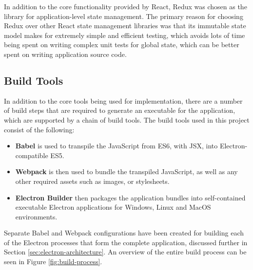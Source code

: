 In addition to the core functionality provided by React, Redux was chosen as the library for application-level state management. The primary reason for choosing Redux over other React state management libraries was that its immutable state model makes for extremely simple and efficient testing, which avoids lots of time being spent on writing complex unit tests for global state, which can be better spent on writing application source code.

\subsection{Build Tools}
In addition to the core tools being used for implementation, there are a number of build steps that are required to generate an executable for the application, which are supported by a chain of build tools. The build tools used in this project consist of the following:

\begin{itemize}
  \item \textbf{Babel} is used to transpile the JavaScript from ES6, with JSX, into Electron-compatible ES5.
  \item \textbf{Webpack} is then used to bundle the transpiled JavaScript, as well as any other required assets such as images, or stylesheets.
  \item \textbf{Electron Builder} then packages the application bundles into self-contained executable Electron applications for Windows, Linux and MacOS environments.
\end{itemize}

Separate Babel and Webpack configurations have been created for building each of the Electron processes that form the complete application, discussed further in Section \ref{sec:electron-architecture}. An overview of the entire build process can be seen in Figure \ref{fig:build-process}.

